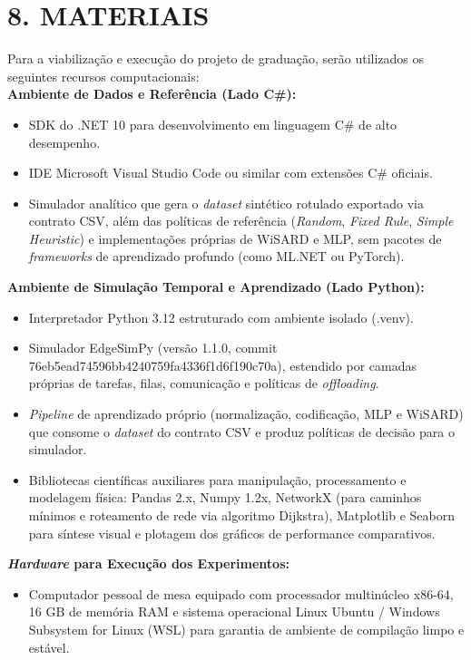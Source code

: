 \documentclass[12pt,a4paper]{article}
\begin{document}
\section*{\bfseries 8. MATERIAIS}
Para a viabilização e execução do projeto de graduação, serão utilizados os seguintes recursos
computacionais:\\
\textbf{Ambiente de Dados e Referência (Lado C\#):}
\begin{itemize}
    \item SDK do .NET 10 para desenvolvimento em linguagem C\# de alto desempenho.
    \item IDE Microsoft Visual Studio Code ou similar com extensões C\# oficiais.
    \item Simulador analítico que gera o \textit{dataset} sintético rotulado exportado via
    contrato CSV, além das políticas de referência (\textit{Random}, \textit{Fixed Rule},
    \textit{Simple Heuristic}) e implementações próprias de WiSARD e MLP, sem pacotes de
    \textit{frameworks} de aprendizado profundo (como ML.NET ou PyTorch).
\end{itemize}
\textbf{Ambiente de Simulação Temporal e Aprendizado (Lado Python):}
\begin{itemize}
    \item Interpretador Python 3.12 estruturado com ambiente isolado (.venv).
    \item Simulador EdgeSimPy (versão 1.1.0, commit 76eb5ead74596bb4240759fa4336f1d6f190c70a),
    estendido por camadas próprias de tarefas, filas, comunicação e políticas de
    \textit{offloading}.
    \item \textit{Pipeline} de aprendizado próprio (normalização, codificação, MLP e WiSARD) que
    consome o \textit{dataset} do contrato CSV e produz políticas de decisão para o simulador.
    \item Bibliotecas científicas auxiliares para manipulação, processamento e modelagem física: Pandas 2.x, Numpy 1.2x, NetworkX (para caminhos mínimos e roteamento de rede via algoritmo Dijkstra), Matplotlib e Seaborn para síntese visual e plotagem dos gráficos de performance
comparativos.
\end{itemize}
\textbf{\textit{Hardware} para Execução dos Experimentos:}
\begin{itemize}
    \item Computador pessoal de mesa equipado com processador multinúcleo x86-64, 16 GB de
memória RAM e sistema operacional Linux Ubuntu / Windows Subsystem for Linux (WSL) para
garantia de ambiente de compilação limpo e estável.
\end{itemize}
\end{document}
